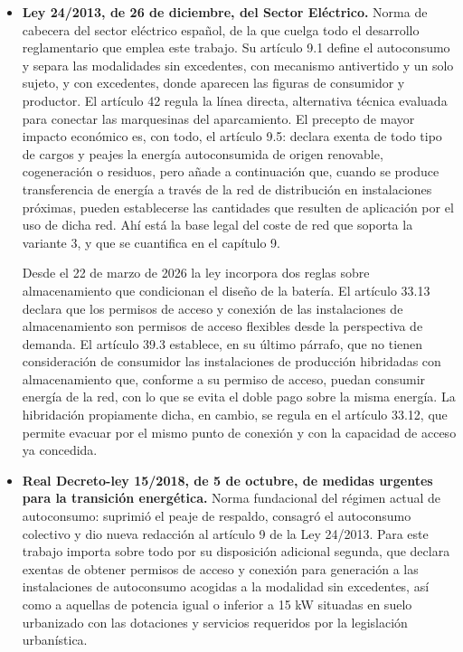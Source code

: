 \begin{itemize}
    \item \textbf{Ley 24/2013, de 26 de diciembre, del Sector Eléctrico.} Norma de cabecera del sector eléctrico español, de la que cuelga todo el desarrollo reglamentario que emplea este trabajo. Su artículo 9.1 define el autoconsumo y separa las modalidades sin excedentes, con mecanismo antivertido y un solo sujeto, y con excedentes, donde aparecen las figuras de consumidor y productor. El artículo 42 regula la línea directa, alternativa técnica evaluada para conectar las marquesinas del aparcamiento. El precepto de mayor impacto económico es, con todo, el artículo 9.5: declara exenta de todo tipo de cargos y peajes la energía autoconsumida de origen renovable, cogeneración o residuos, pero añade a continuación que, cuando se produce transferencia de energía a través de la red de distribución en instalaciones próximas, pueden establecerse las cantidades que resulten de aplicación por el uso de dicha red. Ahí está la base legal del coste de red que soporta la variante 3, y que se cuantifica en el capítulo 9.

    Desde el 22 de marzo de 2026 la ley incorpora dos reglas sobre almacenamiento que condicionan el diseño de la batería. El artículo 33.13 declara que los permisos de acceso y conexión de las instalaciones de almacenamiento son permisos de acceso flexibles desde la perspectiva de demanda. El artículo 39.3 establece, en su último párrafo, que no tienen consideración de consumidor las instalaciones de producción hibridadas con almacenamiento que, conforme a su permiso de acceso, puedan consumir energía de la red, con lo que se evita el doble pago sobre la misma energía. La hibridación propiamente dicha, en cambio, se regula en el artículo 33.12, que permite evacuar por el mismo punto de conexión y con la capacidad de acceso ya concedida.

    \item \textbf{Real Decreto-ley 15/2018, de 5 de octubre, de medidas urgentes para la transición energética.} Norma fundacional del régimen actual de autoconsumo: suprimió el peaje de respaldo, consagró el autoconsumo colectivo y dio nueva redacción al artículo 9 de la Ley 24/2013. Para este trabajo importa sobre todo por su disposición adicional segunda, que declara exentas de obtener permisos de acceso y conexión para generación a las instalaciones de autoconsumo acogidas a la modalidad sin excedentes, así como a aquellas de potencia igual o inferior a 15 kW situadas en suelo urbanizado con las dotaciones y servicios requeridos por la legislación urbanística.


\end{itemize}
